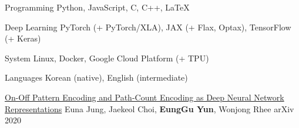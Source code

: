 \documentclass[11pt, a4paper]{cv}
\begin{document}
\begin{cvskills}

  \cvskill
    {Programming} %
    {Python, JavaScript, C, C++, LaTeX} %

  \cvskill
    {Deep Learning} %
    {PyTorch (+ PyTorch/XLA), JAX (+ Flax, Optax), TensorFlow (+ Keras)} %

  \cvskill
    {System} %
    {Linux, Docker, Google Cloud Platform (+ TPU)} %

  \cvskill
    {Languages} %
    {Korean (native), English (intermediate)} %

\end{cvskills}




\vspace{-2mm}

\begin{cvsubentries}

  \cvpublication
    {\href{https://arxiv.org/abs/2401.09518}{On-Off Pattern Encoding and Path-Count Encoding as Deep Neural Network Representations}} %
    {Euna Jung, Jaekeol Choi, \textbf{EungGu Yun}, Wonjong Rhee} %
    {arXiv} %
    {2020} %
    {}

\end{cvsubentries}
\end{document}
